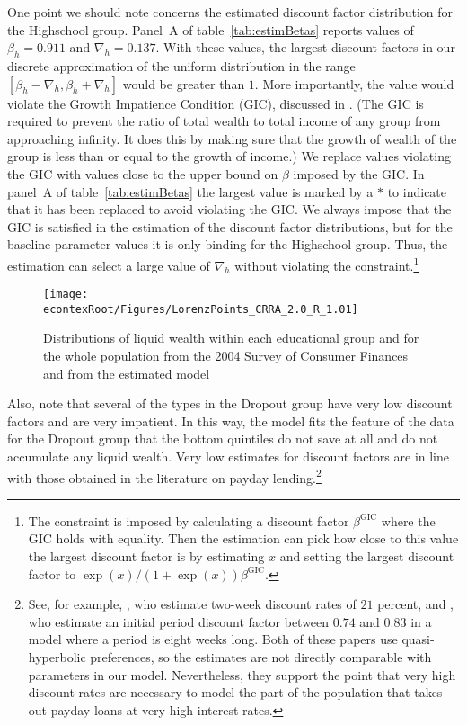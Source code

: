 \documentclass[\econtexRoot/HAFiscal]{subfiles}
\begin{document}
One point we should note concerns the estimated discount factor distribution for the Highschool group.
Panel~A of table~\ref{tab:estimBetas} reports values of $\beta_h=0.911$ and $\nabla_h=0.137$.
With these values, the largest discount factors in our discrete approximation of the uniform distribution in the range $[\beta_h-\nabla_h, \beta_h+\nabla_h]$ would be greater than $1$.
More importantly, the value would violate the Growth Impatience Condition (GIC), discussed in \cite{carroll2022theoretical}.
(The GIC is required to prevent the ratio of total wealth to total income of any group from approaching infinity.
It does this by making sure that the growth of wealth of the group is less than or equal to the growth of income.)
We replace values violating the GIC with values close to the upper bound on $\beta$ imposed by the GIC.
In panel~A of table~\ref{tab:estimBetas} the largest value is marked by a $*$ to indicate that it has been replaced to avoid violating the GIC.
We always impose that the GIC is satisfied in the estimation of the discount factor distributions, but for the baseline parameter values it is only binding for the Highschool group.
Thus, the estimation can select a large value of $\nabla_h$ without violating the constraint.\footnote{The constraint is imposed by calculating a discount factor $\beta^{\text{GIC}}$ where the GIC holds with equality.
Then the estimation can pick how close to this value the largest discount factor is by estimating $x$ and setting the largest discount factor to $\exp(x)/(1+\exp(x)) \beta^{\text{GIC}}$.} 

\begin{figure}[th]
  \begin{center}
    \texttt{[image: \\econtexRoot/Figures/LorenzPoints\_CRRA\_2.0\_R\_1.01]}
    \caption{Distributions of liquid wealth within each educational group and for the whole population from the 2004 Survey of Consumer Finances and from the estimated model}
    \notinsubfile{\label{fig:LorenzPts}}
  \end{center}
\end{figure}

Also, note that several of the types in the Dropout group have very low discount factors and are very impatient.
In this way, the model fits the feature of the data for the Dropout group that the bottom quintiles do not save at all and do not accumulate any liquid wealth.
Very low estimates for discount factors are in line with those obtained in the literature on payday lending.\footnote{See, for example, \cite{skiba2008payday}, who estimate two-week discount rates of $21$ percent, and \cite{allcott2021high}, who estimate an initial period discount factor between $0.74$ and $0.83$ in a model where a period is eight weeks long.
Both of these papers use quasi-hyperbolic preferences, so the estimates are not directly comparable with parameters in our model.
Nevertheless, they support the point that very high discount rates are necessary to model the part of the population that takes out payday loans at very high interest rates.} 
\end{document}
